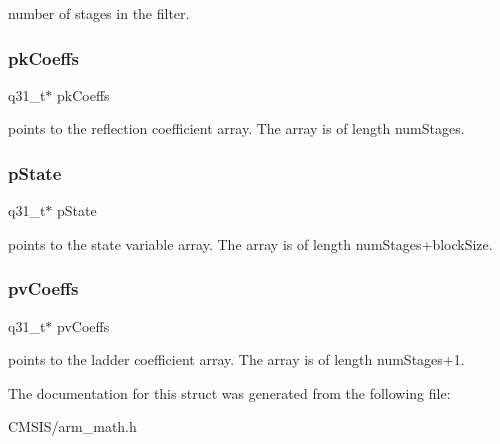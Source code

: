 number of stages in the filter. \mbox{\label{structarm__iir__lattice__instance__q31_a9d45339bf841bf86aec57be5f70d2b01}} 
\subsubsection{\texorpdfstring{pkCoeffs}{pkCoeffs}}
{\footnotesize\ttfamily q31\+\_\+t$\ast$ pk\+Coeffs}

points to the reflection coefficient array. The array is of length num\+Stages. \mbox{\label{structarm__iir__lattice__instance__q31_adee4ba3ee8869865af7d8fa08ca913d6}} 
\subsubsection{\texorpdfstring{pState}{pState}}
{\footnotesize\ttfamily q31\+\_\+t$\ast$ p\+State}

points to the state variable array. The array is of length num\+Stages+block\+Size. \mbox{\label{structarm__iir__lattice__instance__q31_a3d7de56fe9de3458f033a64f14407533}} 
\subsubsection{\texorpdfstring{pvCoeffs}{pvCoeffs}}
{\footnotesize\ttfamily q31\+\_\+t$\ast$ pv\+Coeffs}

points to the ladder coefficient array. The array is of length num\+Stages+1. 

The documentation for this struct was generated from the following file\+:\begin{DoxyCompactItemize}
\item 
C\+M\+S\+I\+S/arm\+\_\+math.\+h\end{DoxyCompactItemize}
